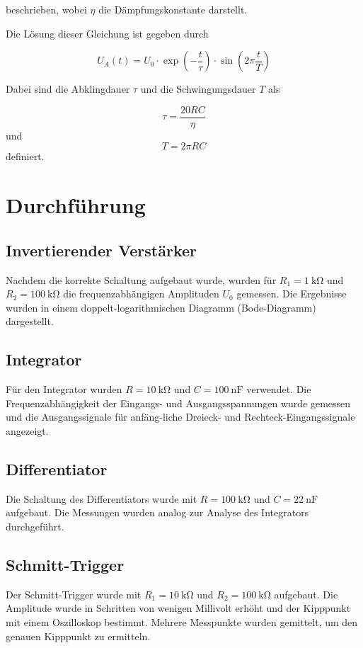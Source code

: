 \documentclass[12pt]{article}
\begin{document}
beschrieben, wobei \( \eta \) die Dämpfungskonstante darstellt.

Die Lösung dieser Gleichung ist gegeben durch

\begin{equation}
    U_A(t) = U_0 \cdot \exp\left( -\frac{t}{\tau} \right) \cdot \sin\left( 2\pi \frac{t}{T} \right)
    \label{eqn:dgllsg}
\end{equation}

Dabei sind die Abklingdauer \( \tau \) und die Schwingungsdauer \( T \) als

\begin{equation}
    \tau = \frac{20RC}{\eta}
    \label{eqn:tau}
\end{equation}
und 
\begin{equation}
    T = 2\pi RC
\end{equation}
definiert.
\section{Durchführung}\label{sec:durchfuehrung}
\subsection{Invertierender Verstärker}
Nachdem die korrekte Schaltung aufgebaut wurde, wurden für \( R_1 = \SI{1}{\kilo\ohm} \) und \( R_2 = \SI{100}{\kilo\ohm} \) die frequenzabhängigen Amplituden \( U_0 \) gemessen. Die Ergebnisse wurden in einem doppelt-logarithmischen Diagramm (Bode-Diagramm) dargestellt.

\subsection{Integrator}
Für den Integrator wurden \( R = \SI{10}{\kilo\ohm} \) und \( C = \SI{100}{\nano\farad} \) verwendet. Die Frequenzabhängigkeit der Eingangs- und Ausgangsspannungen wurde gemessen und die Ausgangssignale für anfäng-liche Dreieck- und Rechteck-Eingangssignale angezeigt.

\subsection{Differentiator}
Die Schaltung des Differentiators wurde mit \( R = \SI{100}{\kilo\ohm} \) und \( C = \SI{22}{\nano\farad} \) aufgebaut. Die Messungen wurden analog zur Analyse des Integrators durchgeführt.

\subsection{Schmitt-Trigger}
Der Schmitt-Trigger wurde mit \( R_1 = \SI{10}{\kilo\ohm} \) und \( R_2 = \SI{100}{\kilo\ohm} \) aufgebaut. Die Amplitude wurde in Schritten von wenigen Millivolt erhöht und der Kipppunkt mit einem Oszilloskop bestimmt. Mehrere Messpunkte wurden gemittelt, um den genauen Kipppunkt zu ermitteln.
\end{document}

